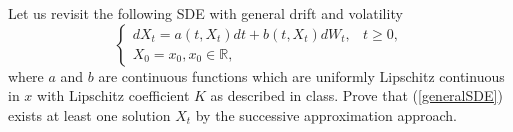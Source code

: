 \newcommand{\arcsinh}{\mathrm{arcsinh}}

    \problem
    \begin{question}
        Let us revisit the following SDE with general drift and volatility
        \begin{equation}\label{generalSDE}
        \left\{
        \begin{array}{ll}
        dX_t=a(t,X_t)dt+b(t,X_t)dW_t,& t\geq0,\\
        X_0=x_0, x_0\in\mathbb R,
        \end{array}
        \right.
        \end{equation}
        where $a$ and $b$ are continuous functions which are uniformly Lipschitz continuous in $x$ with Lipschitz coefficient $K$ as described in class.  Prove that (\ref{generalSDE}) exists at least one solution $X_t$ by the successive approximation approach.
    \end{question}
